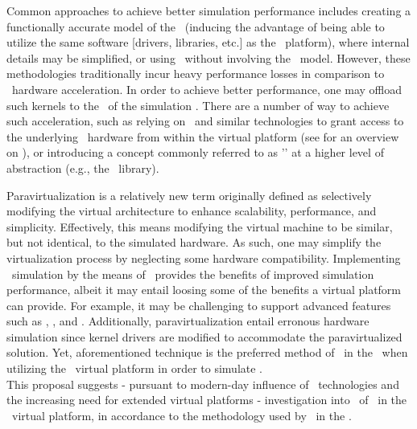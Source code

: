 Common approaches to achieve better simulation performance includes creating a functionally accurate model of the \dvttermgpu\ (inducing the advantage of being able to utilize the same software [drivers, libraries, etc.] as the \dvttermhost\ platform), where internal details may be simplified, or using \dvttermsoftwarerendering\ without involving the \dvttermgpu\ model.
However, these methodologies traditionally incur heavy performance losses in comparison to \dvttermgpu\ hardware acceleration.
In order to achieve better performance, one may offload such kernels to the \dvttermgpu\ of the simulation \dvttermhost .
There are a number of way to achieve such acceleration, such as relying on \dvttermpcipassthrough\ and similar technologies to grant access to the underlying \dvttermhost\ hardware from within the virtual platform (see  for an overview on \dvttermpcipassthrough ), or introducing a concept commonly referred to as '\dvttermparavirtualization ' at a higher level of abstraction (e.g., the \dvttermopengl\ library).

Paravirtualization is a relatively new term originally defined as selectively modifying the virtual architecture to enhance scalability, performance, and simplicity.
Effectively, this means modifying the virtual machine to be similar, but not identical, to the simulated hardware.
As such, one may simplify the virtualization process by neglecting some hardware compatibility.
Implementing \dvttermgpu\ simulation by the means of \dvttermparavirtualization\ provides the benefits of improved simulation performance, albeit it may entail loosing some of the benefits a virtual platform can provide.
For example, it may be challenging to support advanced features such as \termdeterministicexecution , \dvttermcheckpointing , and \dvttermreverseexecution .
Additionally, paravirtualization entail erronous hardware simulation since kernel drivers are modified to accommodate the paravirtualized solution.
Yet, aforementioned technique is the preferred method of \dvttermgoogle\ in the \dvttermandroidsdk\ when utilizing the \dvttermqemu\ virtual platform in order to simulate \dvttermopengles .\\

\noindent
This proposal suggests - pursuant to  modern-day influence of \dvttermgpu\ technologies and the increasing need for extended virtual platforms - investigation into \dvttermparavirtualization\ of \dvttermopengles\ in the \dvttermsimics\ virtual platform, in accordance to the methodology used by \dvttermgoogle\ in the \dvttermandroidsdk .

